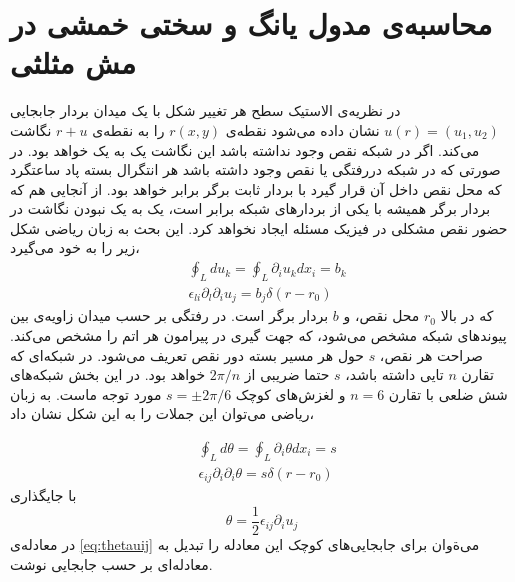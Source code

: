 \section{محاسبه‌ی مدول یانگ و سختی خمشی در مش مثلثی}
در نظریه‌ی الاستیک سطح هر تغییر شکل با یک میدان بردار جابجایی 
$u(r)=(u_1,u_2)$
نشان داده می‌شود نقطه‌ی 
$r(x,y)$
را به نقطه‌ی 
$r+u$
نگاشت می‌کند. اگر در شبکه نقص وجود نداشته باشد این نگاشت یک به یک خواهد بود. در صورتی که در شبکه دررفتگی
یا نقص وجود داشته باشد هر انتگرال بسته پاد ساعتگرد که محل نقص داخل آن قرار گیرد با بردار ثابت برگر
برابر خواهد بود.
\cite{mitchell1961}
از آنجایی هم که بردار برگر همیشه با یکی از بردارهای شبکه برابر است، یک به یک نبودن نگاشت در حضور نقص مشکلی در فیزیک مسئله ایجاد نخواهد کرد. این بحث به زبان ریاضی شکل زیر را به خود می‌گیرد،
\begin{equation}
\begin{aligned}
&\oint_Ldu_k=\oint_L\partial_iu_kdx_i=b_k\\
&\epsilon_{li}\partial_l\partial_iu_j=b_j\delta(r-r_0)
\end{aligned}
\end{equation}
که در بالا 
$r_0$
محل نقص، و 
$b$
 بردار برگر است. در رفتگی  بر حسب میدان زاویه‌ی بین پیوندهای شبکه مشخص می‌شود، که جهت گیری در پیرامون هر اتم را مشخص می‌کند. صراحت هر نقص،
 $s$
 حول هر مسیر بسته دور نقص تعریف می‌شود. در شبکه‌ای که تقارن $n$
 تایی داشته باشد، 
 $s$ حتما ضریبی از 
 $2\pi/n$ خواهد بود.
 در این بخش شبکه‌های شش ضلعی با تقارن 
 $n=6$
و لغزش‌های کوچک
$s=\pm2\pi/6$
مورد توجه ماست. به زبان ریاضی می‌توان این جملات را به این شکل نشان داد،

 \begin{equation}
\begin{aligned}
&\oint_Ld\theta=\oint_L\partial_i\theta dx_i=s\\
&\epsilon_{ij}\partial_i\partial_i\theta=s\delta(r-r_0)
\label{eq:thetauij}
\end{aligned}
\end{equation}
با جایگذاری
\begin{equation}
\theta=\frac{1}{2}\epsilon_{ij}\partial_iu_j
\end{equation}
در معادله‌ی
\ref{eq:thetauij}
می‌ةوان برای جابجایی‌های کوچک این معادله را تبدیل به معادله‌ای بر حسب جابجایی نوشت.

